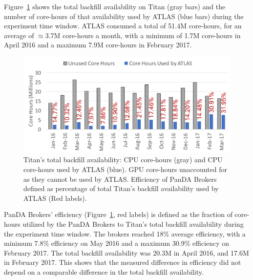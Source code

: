 Figure~\ref{fig:backfill-utilization} shows the total backfill availability on
Titan (gray bars) and the number of core-hours of that availability used by
ATLAS (blue bars) during the experiment time window. ATLAS consumed a total of
51.4M core-hours, for an average of $\approx$3.7M core-hours a month, with a
minimum of 1.7M core-hours in April 2016 and a maximum 7.9M core-hours in
February 2017.

\begin{figure}[htp]
    \includegraphics[clip,width=\columnwidth]{figures/backfill_consumption.pdf}
    \caption{Titan's total backfill availability: CPU core-hours (gray) and CPU
    core-hours used by ATLAS (blue). GPU core-hours unaccounted for as they
    cannot be used by ATLAS. Efficiency of PanDA Brokers defined as percentage
    of total Titan's backfill availability used by ATLAS (Red labels).}
\label{fig:backfill-utilization}
\end{figure}

PanDA Brokers' efficiency (Figure~\ref{fig:backfill-utilization}, red labels) is
defined as the fraction of core-hours utilized by the PanDA Brokers to  Titan’s
total backfill availability during the experiment time window. The brokers
reached 18\% average efficiency, with a minimum 7.8\% efficiency on May 2016 and
a maximum 30.9\% efficiency on February 2017. The total backfill availability
was 20.3M in April 2016, and 17.6M in February 2017. This shows that the
measured difference in efficiency did not depend on a comparable difference in
the total backfill availability.



